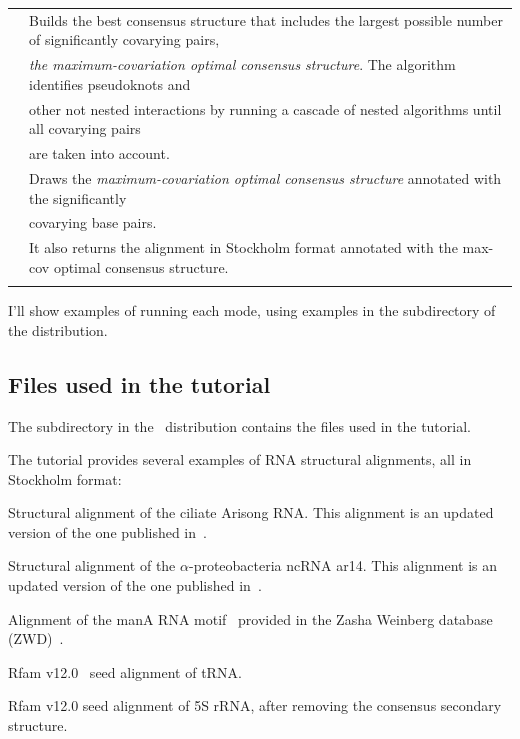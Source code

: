 \begin{tabular}{ll}
\textbf{}   & Builds the best consensus structure that includes the largest possible number of significantly covarying pairs,\\
\textbf{}   & \hspace{5mm}\emph{the maximum-covariation optimal consensus structure}. The algorithm identifies pseudoknots and\\
\textbf{}   & \hspace{5mm}other not nested interactions by running a cascade of nested algorithms until all covarying pairs\\
\textbf{}   & \hspace{5mm}are taken into account.\\
\textbf{}   & Draws the \emph{maximum-covariation optimal consensus structure} annotated with the significantly \\
\textbf{}   & \hspace{5mm}covarying base pairs.\\
\textbf{}   & It also returns the alignment in Stockholm format annotated with the max-cov optimal consensus structure.\\
 & \\ 
\end{tabular}


I'll show examples of running each mode, using examples in the
 subdirectory of the distribution.


\subsection{Files used in the tutorial}

The subdirectory  in the \rscape\ distribution contains the
files used in the tutorial. 

The tutorial provides several examples of RNA structural
alignments, all in Stockholm format:

\begin{sreitems}{}
\item[\emprog{updated\_Arisong.sto}] Structural alignment of the ciliate
  Arisong RNA. This alignment is an updated
  version of the one published in~\citep{JungEddy11}.
\item[\emprog{ar14.sto}] Structural alignment of the $\alpha$-proteobacteria ncRNA ar14. This alignment is an updated version of the one
  published in~\citep{delVal12}.
\item[\emprog{manA.sto}] Alignment of the manA RNA motif~\citep{Weinberg09,Weinberg10} provided in the Zasha Weinberg database (ZWD)~\citep{ZWD18}.
\item[\emprog{RF00005.sto}] Rfam v12.0~\citep{Nawrocki15} seed alignment of tRNA. 
\item[\emprog{RF00001-noss.sto}] Rfam v12.0 seed alignment of 5S rRNA, after removing the consensus secondary structure. 
\end{sreitems}


